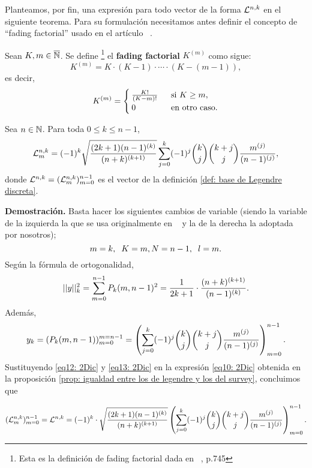 Planteamos, por fin, una expresión para
todo vector de la forma
$\mathcal{L}^{n,k}$ en el siguiente teorema.
Para su formulación necesitamos antes
definir el concepto de ``fading factorial''
usado en el artículo ~\cite{Neuman}.
\begin{defi}
\label{def: fading factorial}
Sean $K, m \in \overline{\mathbb{N}}$. Se define
\footnote{Esta es la definición de
fading factorial dada en ~\cite{Neuman}, p.745 }
el \textbf{fading factorial} $K^{(m)}$ como sigue:
\[
K^{(m)}= K \cdot (K-1) \cdot \cdots \cdot (K-(m-1)),
\]
es decir,\begin{align*}
K^{(m)}= \begin{cases}
\frac{K!}{(K-m)!} & \hspace{0.2cm} \text{si } K \geq m, \\
0 & \hspace{0.2cm} \text{en otro caso.} 
\end{cases}
\end{align*}
\end{defi}

\begin{teo}
\label{teo: expresión analítica de BON de Legendre}
Sea $n\in \mathbb{N}$. Para toda $0 \leq k \leq n-1$,
\begin{equation}
\label{eq0: 6En}
\mathcal{L}^{n,k}_{m}= (-1)^{k} \sqrt{\frac{(2k+1)(n-1)^{(k)}}{(n+k)^{(k+1)}}}
\sum\limits_{j=0}^{k}(-1)^{j}\binom{k}{j}\binom{k+j}{j}
\frac{m^{(j)}}{(n-1)^{(j)}},
\end{equation}
donde $\mathcal{L}^{n,k}=(\mathcal{L}_{m}^{n,k})_{m=0}^{n-1}$
es el vector de la definición
\ref{def: base de Legendre discreta}.
\end{teo}  

\noindent
\textbf{Demostración.}
Basta hacer los siguientes cambios de variable
(siendo la variable de la izquierda la que se
usa originalmente en ~\cite{Neuman} y la de la 
derecha la adoptada por nosotros);
\[
m=k, \hspace{0.2cm} K=m,
N=n-1, \hspace{0.2cm} l=m.
\]
Según la fórmula de ortogonalidad,
\begin{equation}
\label{eq12: 2Dic}
||y||_{k}^{2}= \sum\limits_{m=0}^{n-1}P_{k}(m, n-1)^{2}
= \frac{1}{2k+1} \cdot \frac{(n+k)^{(k+1)}}{(n-1)^{(k)}}.
\end{equation}
Además, 
\begin{equation}
\label{eq13: 2Dic}
y_{k}= (P_{k}(m, n-1))_{m=0}^{m=n-1}
= \left(
\sum\limits_{j=0}^{k}(-1)^{j}\binom{k}{j}\binom{k+j}{j}
\frac{m^{(j)}}{(n-1)^{(j)}}
\right)_{m=0}^{n-1}.
\end{equation}
Sustituyendo \eqref{eq12: 2Dic}
y \eqref{eq13: 2Dic} en la expresión
\eqref{eq10: 2Dic} obtenida
en la proposición
\ref{prop: igualdad entre los de legendre y los del survey},
concluimos que

\[
(\mathcal{L}_{m}^{n,k})_{m=0}^{n-1}
= \mathcal{L}^{n,k}
= (-1)^{k} \cdot 
\sqrt{\frac{(2k+1)(n-1)^{(k)}}{(n+k)^{(k+1)}}}
\left(
\sum\limits_{j=0}^{k}(-1)^{j}\binom{k}{j}\binom{k+j}{j}
\frac{m^{(j)}}{(n-1)^{(j)}}
\right)_{m=0}^{n-1}.
\]


\QEDB 
\vspace{0.2cm}
